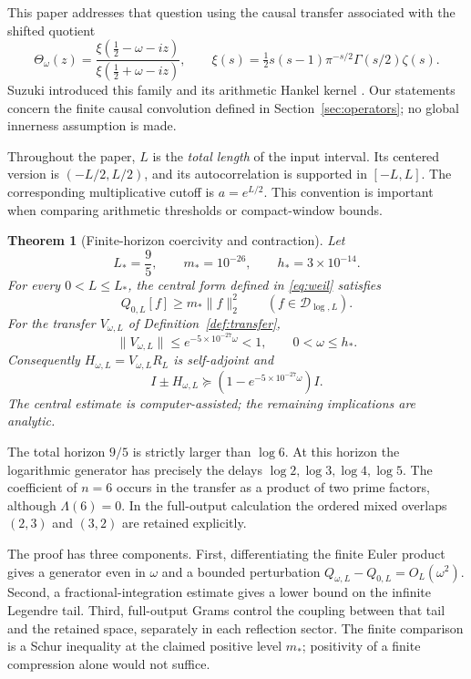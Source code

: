 \documentclass[11pt]{article}
\numberwithin{equation}{section}
\newtheorem{theorem}{Theorem}[section]
\theoremstyle{definition}
\theoremstyle{remark}
\newcommand{\DD}{\mathcal D}
\newcommand{\norm}[1]{\lVert#1\rVert}
\newcommand{\Lstar}{L_*}
\newcommand{\mstar}{m_*}
\newcommand{\hstar}{h_*}
\begin{document}
This paper addresses that question using the causal transfer associated with
the shifted quotient
\begin{equation}\label{eq:theta}
 \Theta_\omega(z)=
 \frac{\xi(\tfrac12-\omega-iz)}{\xi(\tfrac12+\omega-iz)},\qquad
 \xi(s)=\tfrac12s(s-1)\pi^{-s/2}\Gamma(s/2)\zeta(s).
\end{equation}
Suzuki introduced this family and its arithmetic Hankel kernel
\cite{Suzuki2016}. Our statements concern the finite causal convolution
defined in Section~\ref{sec:operators}; no global innerness assumption is made.

Throughout the paper, $L$ is the \emph{total length} of the input interval.
Its centered version is $(-L/2,L/2)$, and its autocorrelation is supported
in $[-L,L]$. The corresponding multiplicative cutoff is $a=e^{L/2}$.
This convention is important when comparing arithmetic thresholds or
compact-window bounds.

\begin{theorem}[Finite-horizon coercivity and contraction]\label{thm:main}
Let
\[
 \Lstar=\frac95,\qquad \mstar=10^{-26},\qquad \hstar=3\times10^{-14}.
\]
For every $0<L\le\Lstar$, the central form defined in
\eqref{eq:weil} satisfies
\begin{equation}\label{eq:maincentral}
 Q_{0,L}[f]\ge\mstar\norm f_2^2\qquad(f\in\DD_{\log,L}).
\end{equation}
For the transfer $V_{\omega,L}$ of Definition~\ref{def:transfer},
\begin{equation}\label{eq:maintransfer}
 \norm{V_{\omega,L}}\le e^{-5\times10^{-27}\omega}<1,
 \qquad 0<\omega\le\hstar.
\end{equation}
Consequently $H_{\omega,L}=V_{\omega,L}R_L$ is self-adjoint and
\begin{equation}\label{eq:mainreflection}
 I\pm H_{\omega,L}\succeq
 (1-e^{-5\times10^{-27}\omega})I.
\end{equation}
The central estimate is computer-assisted; the remaining implications are
analytic.
\end{theorem}

The total horizon $9/5$ is strictly larger than $\log6$. At this horizon
the logarithmic generator has precisely the delays $\log2,\log3,\log4,\log5$.
The coefficient of $n=6$ occurs in the transfer as a product of two prime
factors, although $\Lambda(6)=0$. In the full-output calculation the ordered
mixed overlaps $(2,3)$ and $(3,2)$ are retained explicitly.

The proof has three components. First, differentiating the finite Euler
product gives a generator even in $\omega$ and a bounded perturbation
$Q_{\omega,L}-Q_{0,L}=O_L(\omega^2)$. Second, a fractional-integration estimate
gives a lower bound on the infinite Legendre tail. Third, full-output Grams
control the coupling between that tail and the retained space, separately in
each reflection sector. The finite comparison is a Schur inequality at the
claimed positive level $\mstar$; positivity of a finite compression alone
would not suffice.
\end{document}
